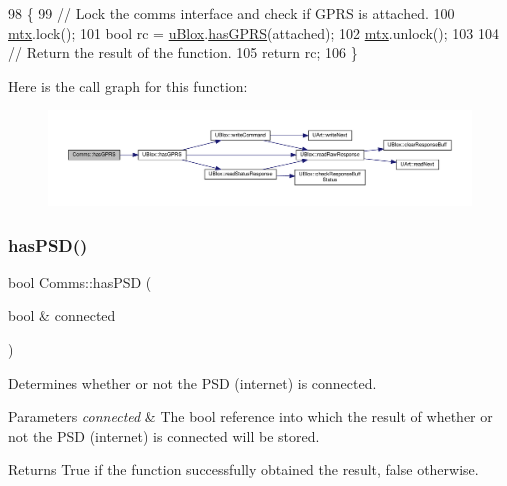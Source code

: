 \begin{DoxyCode}
98 \{
99     \textcolor{comment}{// Lock the comms interface and check if GPRS is attached.}
100     \hyperlink{class_comms_a21df861b1202573e4cd0cb5666d638fe}{mtx}.lock();
101     \textcolor{keywordtype}{bool} rc = \hyperlink{class_comms_ac64dea134b116147e5441172346dbd6c}{uBlox}.\hyperlink{class_u_blox_a4f5a31b4ddda664b255ce3f63e9ffac7}{hasGPRS}(attached);
102     \hyperlink{class_comms_a21df861b1202573e4cd0cb5666d638fe}{mtx}.unlock();
103 
104     \textcolor{comment}{// Return the result of the function.}
105     \textcolor{keywordflow}{return} rc;
106 \}
\end{DoxyCode}
Here is the call graph for this function\+:\nopagebreak
\begin{figure}[H]
\begin{center}
\leavevmode
\includegraphics[width=350pt]{d8/dcc/class_comms_a583e3d933cca0c1eca9ec77e66bd6b84_cgraph}
\end{center}
\end{figure}
\mbox{\label{class_comms_a2c43ce409b48f4d28eefb7934cdd1523}} 
\subsubsection{\texorpdfstring{has\+P\+S\+D()}{hasPSD()}}
{\footnotesize\ttfamily bool Comms\+::has\+P\+SD (\begin{DoxyParamCaption}\item[{bool \&}]{connected }\end{DoxyParamCaption})}

Determines whether or not the P\+SD (internet) is connected.


\begin{DoxyParams}{Parameters}
{\em connected} & The bool reference into which the result of whether or not the P\+SD (internet) is connected will be stored. \\
\hline
\end{DoxyParams}
\begin{DoxyReturn}{Returns}
True if the function successfully obtained the result, false otherwise. 
\end{DoxyReturn}


